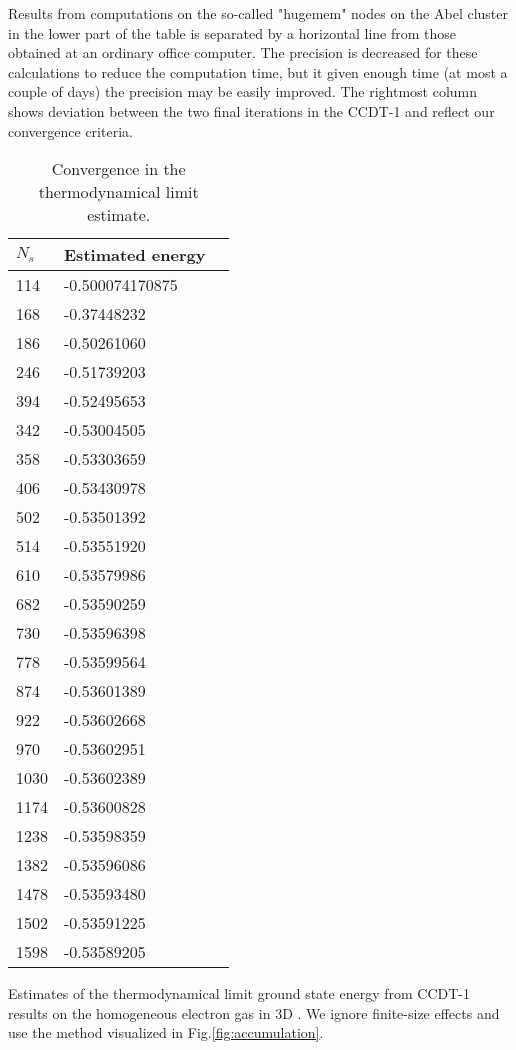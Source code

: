 \begin{table}[h]
\begin{center}
\begin{threeparttable}
\begin{tablenotes}
Results from computations on the so-called "hugemem" nodes on the Abel cluster in the lower part of the table is separated by a horizontal line from those obtained at an ordinary office computer. The precision is decreased for these calculations to reduce the computation time, but it given enough time (at most a couple of days) the precision may be easily improved. The rightmost column shows deviation between the two final iterations in the CCDT-1 and reflect our convergence criteria.
\end{tablenotes}
\end{threeparttable}
\end{center}
\label{tab:extrap_large}
\end{table}

\begin{table}[h]
\caption{Convergence in the thermodynamical limit estimate.}
\begin{center}
\begin{threeparttable}
\begin{tabular}{l l l}
    \toprule
$N_s$ & Estimated energy \\ \hline
114&-0.500074170875 \\
168&-0.37448232\\
186&-0.50261060\\
246& -0.51739203\\
394&-0.52495653\\
342&-0.53004505\\
358&-0.53303659\\
406&-0.53430978\\
502&-0.53501392\\
514&-0.53551920\\
610&-0.53579986\\
682&-0.53590259\\
730&-0.53596398\\
778&-0.53599564\\
874&-0.53601389\\
922&-0.53602668\\
970&-0.53602951\\
1030&-0.53602389\\
1174&-0.53600828\\
1238&-0.53598359\\
1382&-0.53596086\\
1478&-0.53593480\\
1502&-0.53591225\\
1598&-0.53589205\\
\bottomrule
\end{tabular}
\begin{tablenotes}
Estimates of the thermodynamical limit ground state energy from CCDT-1 results on the homogeneous electron gas in 3D . We ignore finite-size effects and use the method visualized in Fig.\ref{fig:accumulation}. 
\end{tablenotes}
\end{threeparttable}
\end{center}
\label{tab:extrap_convergence}
\end{table}

